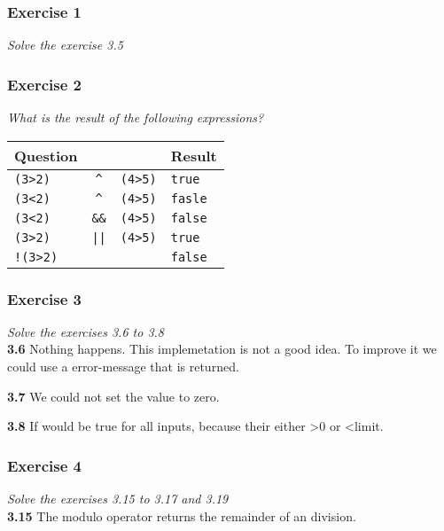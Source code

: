 \subsubsection*{Exercise 1}
\textit{Solve the exercise 3.5}\\


\subsubsection*{Exercise 2}
\textit{What is the result of the following expressions?}\\

\begin{table}[h!]
	\begin{tabular}{l c l l}
	Question & & & Result \\ \hline
	\lstinline!(3>2)! & \lstinline!^! & \lstinline!(4>5)! & \lstinline!true! \\
	\lstinline!(3<2)! & \lstinline!^! & \lstinline!(4>5)! & \lstinline!fasle! \\
	\lstinline!(3<2)! & \lstinline!&&! & \lstinline!(4>5)! & \lstinline!false! \\
	\lstinline!(3>2)! & \lstinline!||! & \lstinline!(4>5)! & \lstinline!true!\\
	\lstinline?!(3>2)? &  &  & \lstinline!false!
	\end{tabular}
\end{table}

\subsubsection*{Exercise 3}
\textit{Solve the exercises 3.6 to 3.8}\\

\textbf{3.6} Nothing happens. This implemetation is not a good idea. To improve
it we could use a error-message that is returned.

\textbf{3.7} We could not set the value to zero.

\textbf{3.8} If would be true for all inputs, because their either >0 or <limit.

\subsubsection*{Exercise 4}
\textit{Solve the exercises 3.15 to 3.17 and 3.19}\\

\textbf{3.15} The modulo operator returns the remainder of an division.

